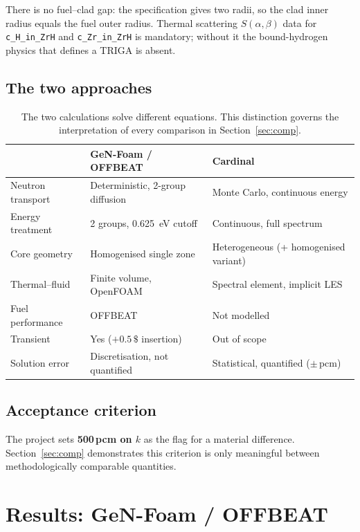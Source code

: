 \documentclass[11pt,a4paper]{article}
\newcommand{\pcm}{\,pcm}
\begin{document}
There is no fuel--clad gap: the specification gives two radii, so the clad inner radius
equals the fuel outer radius. Thermal scattering $S(\alpha,\beta)$ data for
\texttt{c\_H\_in\_ZrH} and \texttt{c\_Zr\_in\_ZrH} is mandatory; without it the
bound-hydrogen physics that defines a TRIGA is absent.

\subsection{The two approaches}
\begin{table}[H]\centering\small
\caption{The two calculations solve different equations. This distinction governs the
interpretation of every comparison in Section~\ref{sec:comp}.}
\begin{tabular}{@{}lll@{}}
\toprule
 & \textbf{GeN-Foam / OFFBEAT} & \textbf{Cardinal}\\
\midrule
Neutron transport & Deterministic, 2-group diffusion & Monte Carlo, continuous energy\\
Energy treatment & 2 groups, \SI{0.625}{\electronvolt} cutoff & Continuous, full spectrum\\
Core geometry & Homogenised single zone & Heterogeneous (+ homogenised variant)\\
Thermal--fluid & Finite volume, OpenFOAM & Spectral element, implicit LES\\
Fuel performance & OFFBEAT & Not modelled\\
Transient & Yes ($+0.5\,\$$ insertion) & Out of scope\\
Solution error & Discretisation, not quantified & Statistical, quantified ($\pm$\,pcm)\\
\bottomrule
\end{tabular}
\end{table}

\subsection{Acceptance criterion}
The project sets \textbf{500\pcm{} on $k$} as the flag for a material difference.
Section~\ref{sec:comp} demonstrates this criterion is only meaningful between
methodologically comparable quantities.

\newpage
\section{Results: GeN-Foam / OFFBEAT}
\end{document}
